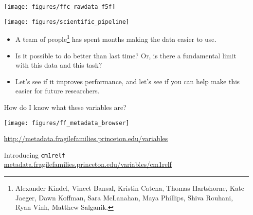 \documentclass{beamer}
\begin{document}
\begin{frame}

\begin{center}
\texttt{[image: figures/ffc\_rawdata\_f5f]}
\end{center}

\end{frame}
\begin{frame}

\begin{center}
\texttt{[image: figures/scientific\_pipeline]}
\end{center}

\end{frame}
\begin{frame}

\begin{itemize}
\item A team of people\footnote{Alexander Kindel, Vineet Bansal, Kristin Catena, Thomas Hartshorne, Kate Jaeger, Dawn Koffman, Sara McLanahan, Maya Phillips, Shiva Rouhani, Ryan Vinh, Matthew Salganik.} has spent months making the data easier to use. \pause
\item Is it possible to do better than last time? Or, is there a fundamental limit with this data and this task? \pause
\item Let's see if it improves performance, \pause and let's see if you can help make this easier for future researchers.
\end{itemize}

\end{frame}
\begin{frame}

How do I know what these variables are? 

\begin{center}
\texttt{[image: figures/ff\_metadata\_browser]}
\end{center}

\vfill

\url{http://metadata.fragilefamilies.princeton.edu/variables}

\end{frame}
\begin{frame}

Introducing \texttt{cm1relf}\\

\url{metadata.fragilefamilies.princeton.edu/variables/cm1relf}

\end{frame}
\end{document}
